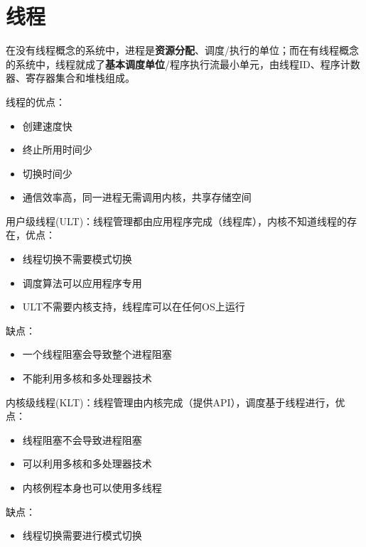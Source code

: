 
\section{线程}
在没有线程概念的系统中，进程是\textbf{资源分配}、调度/执行的单位；而在有线程概念的系统中，线程就成了\textbf{基本调度单位}/程序执行流最小单元，由线程ID、程序计数器、寄存器集合和堆栈组成。

线程的优点：
\begin{itemize}
    \item 创建速度快
    \item 终止所用时间少
    \item 切换时间少
    \item 通信效率高，同一进程无需调用内核，共享存储空间
\end{itemize}

\bigskip
用户级线程(ULT)：线程管理都由应用程序完成（线程库），内核不知道线程的存在，优点：
\begin{itemize}
    \item 线程切换不需要模式切换
    \item 调度算法可以应用程序专用
    \item ULT不需要内核支持，线程库可以在任何OS上运行
\end{itemize}
缺点：
\begin{itemize}
    \item 一个线程阻塞会导致整个进程阻塞
    \item 不能利用多核和多处理器技术
\end{itemize}

\bigskip
内核级线程(KLT)：线程管理由内核完成（提供API），调度基于线程进行，优点：
\begin{itemize}
    \item 线程阻塞不会导致进程阻塞
    \item 可以利用多核和多处理器技术
    \item 内核例程本身也可以使用多线程
\end{itemize}
缺点：
\begin{itemize}
    \item 线程切换需要进行模式切换
\end{itemize}


